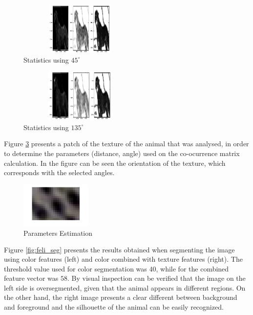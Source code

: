 \documentclass{IEEEtran}
\begin{document}
\begin{figure}[h!] 
 \centering
 \includegraphics[width=175pt,height=75pt]{./fig/feli/fstats_135_n1_1.png}%
 \caption{Statistics using $45^{\circ}$}
 \label{fig:feli_45}
\end{figure}

\begin{figure}[h!] 
 \centering
 \includegraphics[width=175pt,height=75pt]{./fig/feli/fstats_135_n1_n1.png}%
 \caption{Statistics using $135^{\circ}$}
 \label{fig:feli_135}
\end{figure}

Figure \ref{fig:parameters} presents a patch of the texture of the animal that was analysed, in order to determine the parameters (distance, angle) used on the co-ocurrence matrix calculation. In the figure can be seen the orientation of the texture, which corresponds with the selected angles.\\

\begin{figure}[h!] 
 \centering
 \includegraphics[width=100pt]{./fig/feli/patch_params.png}%
 \caption{Parameters Estimation}
 \label{fig:parameters}
\end{figure}

Figure \ref{fig:feli_seg} presents the results obtained when segmenting the image using color features (left) and color combined with texture features (right). The threshold value used for color segmentation was $40$, while for the combined feature vector was $58$. By visual inspection can be verified that the image on the left side is oversegmented, given that the animal appears in different regions. On the other hand, the right image presents a clear different between background and foreground and the silhouette of the animal can be easily recognized.
\end{document}
